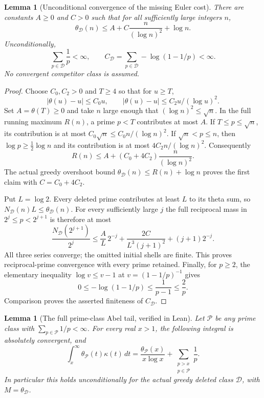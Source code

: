 \documentclass[11pt]{article}
\newtheorem{lemma}[theorem]{Lemma}
\theoremstyle{definition}
\begin{document}
\begin{lemma}[Unconditional convergence of the missing Euler cost]
\label{lem:greedy-prime-missing-cost-convergence}
There are constants $A\ge0$ and $C>0$ such that for all sufficiently
large integers $n$,
\[
 \theta_{\mathcal D}(n)
 \le A+C\frac{n}{(\log n)^2}+\log n.
\]
Unconditionally,
\[
 \sum_{p\in\mathcal D}\frac1p<\infty,
 \qquad
 C_{\mathcal D}=\sum_{p\in\mathcal D}-\log(1-1/p)<\infty.
\]
No convergent competitor class is assumed.
\end{lemma}

\begin{proof}
Choose $C_0,C_2>0$ and $T\ge4$ so that for $u\ge T$,
\[
 |\theta(u)-u|\le C_0u,
 \qquad
 |\theta(u)-u|\le C_2u/(\log u)^2.
\]
Set $A=\theta(T)\ge0$ and take $n$ large enough that
$(\log n)^2\le\sqrt n$.
In the full running maximum $R(n)$, a prime $p<T$ contributes at most
$A$. If $T\le p\le\sqrt n$, its contribution is at most
$C_0\sqrt n\le C_0n/(\log n)^2$.
If $\sqrt n<p\le n$, then $\log p\ge\tfrac12\log n$ and its
contribution is at most $4C_2n/(\log n)^2$.
Consequently
\[
 R(n)\le A+(C_0+4C_2)\frac{n}{(\log n)^2}.
\]
The actual greedy overshoot bound
$\theta_{\mathcal D}(n)\le R(n)+\log n$ proves the first claim
with $C=C_0+4C_2$.

Put $L=\log2$.
Every deleted prime contributes at least $L$ to its theta sum, so
$N_{\mathcal D}(n)L\le\theta_{\mathcal D}(n)$.
For every sufficiently large $j$ the full reciprocal mass in
$2^j\le p<2^{j+1}$ is therefore at most
\[
 \frac{N_{\mathcal D}(2^{j+1})}{2^j}
 \le \frac{A}{L}\,2^{-j}
     +\frac{2C}{L^3(j+1)^2}
     +(j+1)2^{-j}.
\]
All three series converge; the omitted initial shells are finite.
This proves reciprocal-prime convergence with every prime retained.
Finally, for $p\ge2$, the elementary inequality
$\log v\le v-1$ at $v=(1-1/p)^{-1}$ gives
\[
 0\le-\log(1-1/p)
 \le\frac1{p-1}\le\frac2p.
\]
Comparison proves the asserted finiteness of $C_{\mathcal D}$.
\end{proof}

\begin{lemma}[The full prime-class Abel tail, verified in Lean]
\label{lem:prime-class-full-Nicolas-Abel-tail}
Let $\mathcal P$ be any prime class with
$\sum_{p\in\mathcal P}1/p<\infty$.
For every real $x>1$, the following integral is absolutely convergent,
and
\[
 \int_x^\infty\theta_{\mathcal P}(t)\kappa(t)\,dt
 =\frac{\theta_{\mathcal P}(x)}{x\log x}
    +\sum_{\substack{p>x\\p\in\mathcal P}}\frac1p.
\]
In particular this holds unconditionally for the actual greedy
deleted class $\mathcal D$, with $M=\theta_{\mathcal D}$.
\end{lemma}
\end{document}
